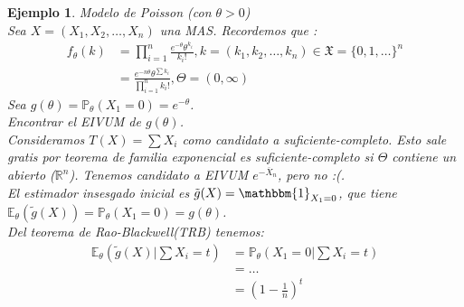 \documentclass[10pt]{article}
\theoremstyle{plain}
\newtheorem{ej}{Ejemplo}
\theoremstyle{definition}
\begin{document}
\begin{ej} Modelo de Poisson (con $\theta>0$)\\
Sea $X=(X_{1},X_{2},\ldots,X_{n})$ una MAS. Recordemos que :
\begin{align*}
f_{\theta}(k) &= \prod_{i=1}^n \frac{e^{-\theta} \theta^{k_{i}}}{k_{i}!}, k =(k_{1},k_{2},\ldots, k_{n}) \in \mathfrak{X} = \{0,1,\ldots\}^n\\
&= \frac{e^{-n\theta}\theta^{\sum k_{i}}}{\prod_{i=1}^n k_{i}!}, \Theta = (0,\infty)
\end{align*}
Sea $g(\theta) = \mathbb{P}_{\theta}(X_{1}=0)=e^{-\theta}$.\\
Encontrar el EIVUM de $g(\theta)$.\\
Consideramos $T(X) = \sum X_{i}$ como candidato a suficiente-completo. Esto sale gratis por teorema de familia exponencial es suficiente-completo si $\Theta$ contiene un abierto ($\mathbb{R}^n$). Tenemos candidato a EIVUM $e^{-\overline{X}_{n}}$, pero no :(.\\
El estimador insesgado inicial es $\tilde{g}(X) = \mathbbm{1}_{X_{1}=0}$, que tiene $\mathbb{E}_{\theta}(\tilde{g}(X)) = \mathbb{P}_{\theta}(X_{1}=0)=g(\theta)$.\\
Del teorema de Rao-Blackwell(TRB) tenemos:
\begin{align*}
\mathbb{E}_{\theta}(\tilde{g}(X)| \sum X_{i} = t) &= \mathbb{P}_{\theta}(X_{1}=0| \sum X_{i} = t)\\
&= \ldots \\
&= \left(1-\frac{1}{n}\right)^t
\end{align*}
\end{ej}
\end{document}
